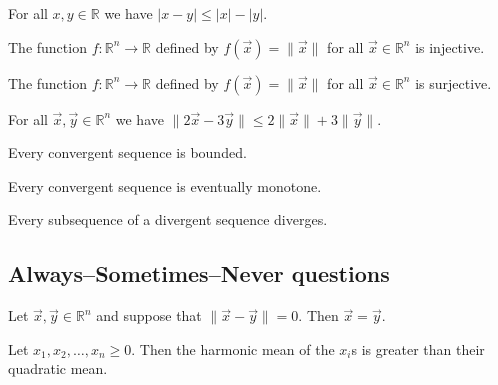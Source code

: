 \begin{chapex} %
\label{cqRealNumbersTFBegin}
For all $x,y \in \mathbb{R}$ we have $|x-y| \le |x| - |y|$.
\end{chapex}

\begin{chapex} %
The function $f : \mathbb{R}^n \to \mathbb{R}$ defined by $f(\vec x) = \lVert \vec x \rVert$ for all $\vec x \in \mathbb{R}^n$ is injective.
\end{chapex}

\begin{chapex} %
The function $f : \mathbb{R}^n \to \mathbb{R}$ defined by $f(\vec x) = \lVert \vec x \rVert$ for all $\vec x \in \mathbb{R}^n$ is surjective.
\end{chapex}

\begin{chapex} %
For all $\vec x, \vec y \in \mathbb{R}^n$ we have $\lVert 2\vec x - 3\vec y \rVert \le 2\lVert \vec x \rVert + 3\lVert \vec y \rVert$.
\end{chapex}

\begin{chapex} %
Every convergent sequence is bounded.
\end{chapex}

\begin{chapex} %
Every convergent sequence is eventually monotone.
\end{chapex}

\begin{chapex} %
\label{cqRealNumbersTFEnd}
Every subsequence of a divergent sequence diverges.
\end{chapex}

\subsection*{Always--Sometimes--Never questions}


\begin{chapex} %
\label{cqRealNumbersASNBegin}
Let $\vec x, \vec y \in \mathbb{R}^n$ and suppose that $\lVert \vec x - \vec y \rVert = 0$. Then $\vec x = \vec y$.
\end{chapex}

\begin{chapex} %
Let $x_1, x_2, \dots, x_n \ge 0$. Then the harmonic mean of the $x_i$s is greater than their quadratic mean.
\end{chapex}

